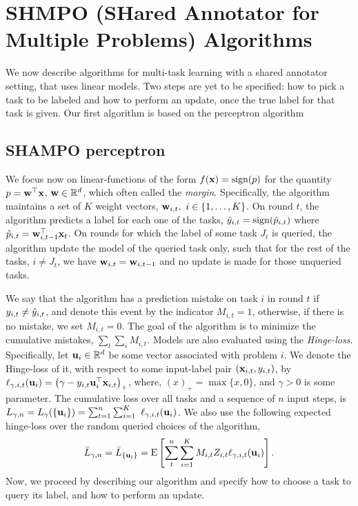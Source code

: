 \chapter{SHMPO (SHared Annotator for Multiple Problems) Algorithms}

We now describe algorithms for multi-task learning with
a shared annotator setting, that uses linear models. Two steps are
yet to be specified: how to pick a task to be labeled  and how to
perform an update, once the true label for that task is given.
Our first algorithm is based on the perceptron algorithm 

\section{SHAMPO perceptron}

We focus now on linear-functions of the form $f(\mathbf{x})={\rm sign}(p)$ for the
quantity $p={\mathbf{w}}^{\top}\mathbf{x}$, $\mathbf{w}\in\mathbb{R}^d$,  which often called the
\textit{margin}.
Specifically, the algorithm maintains a set of $K$ weight
vectors, $\mathbf{w}_{i,t},~i\in\left\{{1, \ldots , K}\right\}$. On round $t$, the algorithm predicts a label for each
 one of the tasks, $\hat{y}_{i,t}={\rm sign}(\hat{p}_{i,t})$ where $\hat{p}_{i,t}={\mathbf{w}}^{\top}_{i,t-1}\mathbf{x}_{t}$. 
 On rounds for which the label of some task $J_t$ is queried, the algorithm update the model of the
 queried task only, such that for the rest of the tasks, $i\neq J_t$, we have $\mathbf{w}_{i,t}=\mathbf{w}_{i,t-1}$ and no
 update is made for those unqueried tasks.       

We say that the algorithm has a prediction mistake on task $i$ in round $t$ if
$y_{i,t} \neq \hat{y}_{i,t}$, and denote this event by the indicator $M_{i,t}=1$,
otherwise, if there is no mistake, we set $M_{i,t}=0$. The goal of the
algorithm is to minimize the cumulative mistakes, $\sum_t \sum_i
M_{i,t}$. Models are also evaluated using the
{\em Hinge-loss}. Specifically, let $\mathbf{u}_{i}\in\mathbb{R}^d$ be some vector
associated with problem $i$. We denote the Hinge-loss  of it, with respect
to some input-label  pair $\left({\mathbf{x}_{i,t},y_{i,t}}\right)$, by
$\ell_{\gamma,i,t}(\mathbf{u}_{i})= \left({\gamma-y_{i,t}
  {\mathbf{u}}^{\top}_{i}\mathbf{x}_{i,t}}\right)_{+}$, where, $(x)_+=\max\{x,0\}$, and $\gamma>0$ is
some parameter. The cumulative loss over all tasks and a sequence of
$n$ input steps, is
$ %
L_{\gamma,n} =L_{\gamma}(\{ \vui{i} \})=\sum_{t=1}^{n} \sum_{i=1}^{K}\ {\lossp{\gamma,i,t}(\vui{i})}
$. %
We also use the following expected hinge-loss over the random queried choices
of the algorithm, 
\begin{equation}
\bar{L}_{\gamma,n}=\bar{L}_{ \{ \mathbf{u}_{i}\}}
={\rm E}\left[{\sum_t^n \sum_{i=1}^{K}{M_{i,t}Z_{i,t}\ell_{\gamma,i,t}(\mathbf{u}_{i})}}\right]. 
 \end{equation}
Now, we proceed by  describing our algorithm and specify how to choose a task to query its label,
 and how to perform an update.
 


